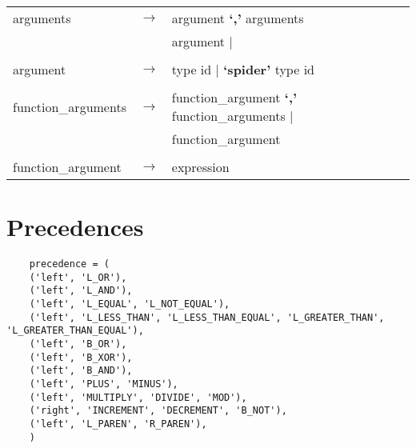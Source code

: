 \documentclass[landscape]{article}
\begin{document}
\begin{longtable}{ l c l}
    \\

    arguments & \ensuremath{\to} &  argument  \textbf{`,'} arguments    \\
    & &  argument   | \\

    \\

    argument & \ensuremath{\to} &  type  id  | \textbf{`spider'} type  id   \\

    \\

    function\_arguments & \ensuremath{\to} &  function\_argument  \textbf{`,'} function\_arguments   | \\
    & &  function\_argument    \\

    \\

    function\_argument & \ensuremath{\to} &  expression  \\

  \end{longtable}

  \section{Precedences}
  \begin{verbatim}
    precedence = (
    ('left', 'L_OR'),
    ('left', 'L_AND'),
    ('left', 'L_EQUAL', 'L_NOT_EQUAL'),
    ('left', 'L_LESS_THAN', 'L_LESS_THAN_EQUAL', 'L_GREATER_THAN', 'L_GREATER_THAN_EQUAL'),
    ('left', 'B_OR'),
    ('left', 'B_XOR'),
    ('left', 'B_AND'),
    ('left', 'PLUS', 'MINUS'),
    ('left', 'MULTIPLY', 'DIVIDE', 'MOD'),
    ('right', 'INCREMENT', 'DECREMENT', 'B_NOT'),
    ('left', 'L_PAREN', 'R_PAREN'),
    )
  \end{verbatim}
\end{document}
